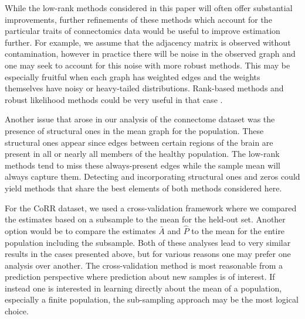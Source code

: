 \documentclass[10pt,letterpaper]{article}
\renewcommand{\hat}{\widehat}
\begin{document}

While the low-rank methods considered in this paper will often offer substantial improvements, further refinements of these methods which account for the particular traits of connectomics data would be useful to improve estimation further.
For example, we assume that the adjacency matrix is observed without contamination, however in practice there will be noise in the observed graph and one may seek to account for this noise with more robust methods.
This may be especially fruitful when each graph has weighted edges and the weights themselves have noisy or heavy-tailed distributions.
Rank-based methods and robust likelihood methods could be very useful in that case \citep{huber2009robust,qin2013maximum}. 


Another issue that arose in our analysis of the connectome dataset was the presence of structural ones in the mean graph for the population. 
These structural ones appear since edges between certain regions of the brain are present in all or nearly all members of the healthy population. 
The low-rank methods tend to miss these always-present edges while the sample mean will always capture them.
Detecting and incorporating structural ones and zeros could yield methods that share the best elements of both methods considered here.

For the CoRR dataset, we used a cross-validation framework where we compared the estimates based on a subsample to the mean for the held-out set. 
Another option would be to compare the estimates $\bar{A}$ and $\hat{P}$ to the mean for the entire population including the subsample.
Both of these analyses lead to very similar results in the cases presented above, but for various reasons one may prefer one analysis over another.
The cross-validation method is most reasonable from a prediction perspective where prediction about new samples is of interest.
If instead one is interested in learning directly about the mean of a population, especially a finite population, the sub-sampling approach may be the most logical choice.
\end{document}
